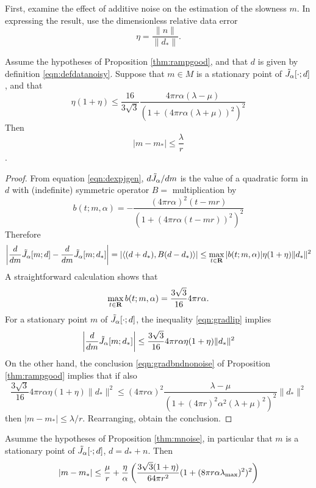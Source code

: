 First, examine the effect of additive noise on the estimation of the
slowness $m$. In expressing the result, use the dimensionless
relative data error
\begin{equation}
  \label{eqn:defeta}
  \eta = \frac{\|n\|}{\|d_*\|}. 
\end{equation}

\begin{proposition}
  \label{thm:mnoise}
  Assume the hypotheses of Proposition \ref{thm:rampgood}, and that $d$ is
  given by definition \ref{eqn:defdatanoisy}. Suppose that $m \in M$
  is a stationary point of $\tilde{J}_{\alpha}[\cdot;d]$, and that
  \begin{equation}
    \label{eqn:mnoisebnd}
    \eta(1+\eta) \le \frac{16}{3\sqrt{3}}\frac{4\pi r \alpha
      (\lambda-\mu)}{(1+(4\pi r\alpha(\lambda+\mu))^2)^2}
  \end{equation}
  Then
  \begin{equation}
    \label{eqn:mnoisebndfin}
    |m-m_*| \le \frac{\lambda}{r}
  \end{equation}.
\end{proposition}

\begin{proof}
  From equation \ref{eqn:dexpjgen}, $d \tilde{J}_{\alpha} / dm$ is the
value of a quadratic form in $d$ with (indefinite) symmetric operator
$B = $ multiplication by
\[
  b(t;m,\alpha)  = -\frac{(4 \pi r \alpha)^2 (t-mr)}{(1+(4\pi r \alpha (t-mr))^2)^{2}}
\]
Therefore
\begin{equation}
  \label{eqn:gradlip}
  \left|\frac{d}{dm}\tilde{J}_{\alpha}[m;d]-\frac{d}{dm}\tilde{J}_{\alpha}[m;d_*]\right| =
  |\langle (d+d_*),B(d-d_*)\rangle| \le \max_{t \in
    {\bf R}}|b(t;m,\alpha)|\eta(1+\eta)\|d_*\|^2
\end{equation}
A straightforward calculation shows that
\[
  \max_{t \in {\bf R}} b(t;m,\alpha) = \frac{3\sqrt{3}}{16} 4\pi r\alpha.
\]
For a stationary point $m$ of
$\tilde{J}_{\alpha}[\cdot;d]$, the inequality \ref{eqn:gradlip} implies
\[
  \left|\frac{d}{dm}\tilde{J}_{\alpha}[m;d_*]\right| \le \frac{3\sqrt{3}}{16} 4\pi
  r\alpha \eta(1+\eta)\|d_*\|^2
\]
On the other hand, the conclusion \ref{eqn:gradbndnonoise} of Proposition
\ref{thm:rampgood} implies that if also
\[
  \frac{3\sqrt{3}}{16} 4\pi r\alpha \eta(1+\eta)\|d_*\|^2 \le (4 \pi r
  \alpha)^2 \frac{\lambda-\mu}{(1+(4\pi r)^2\alpha^2
    (\lambda+\mu)^2)^{2}} \|d_*\|^2
\]
then $|m-m_*|\le \lambda/r$. Rearranging, obtain the conclusion.
\end{proof}

\begin{corollary}
  \label{thm:mnoisecor}
  Asumme the hypotheses of Proposition \ref{thm:mnoise}, in particular
  that $m$ is a stationary point of $\tilde{J}_{\alpha}[\cdot;d]$, $d=d_*+n$. Then
  \begin{equation}
    \label{eqn:mnoisecor}
    |m-m_*| \le \frac{\mu}{r} + \frac{\eta}{\alpha} \left(\frac{3\sqrt{3}(1+\eta)}{64\pi r^2}(1+(8\pi r \alpha
      \lambda_{\rm max})^2)^2\right)
  \end{equation}
\end{corollary}

